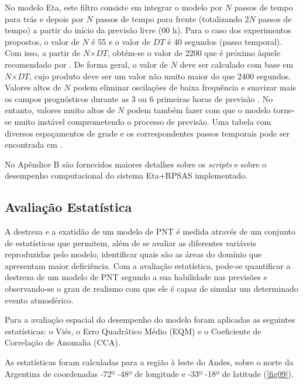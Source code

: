No modelo Eta, este filtro consiste em integrar o modelo por $N$ passos de tempo para trás e depois por $N$ passos de tempo para frente (totalizando $2N$ passos de tempo) a partir do início da previsão livre (00 h). Para o caso dos experimentos propostos, o valor de $N$ é 55 e o valor de $DT$ é 40 segundos (passo temporal). Com isso, a partir de $N$$\times$$DT$, obtém-se o valor de 2200 que é próximo àquele recomendado por . De forma geral, o valor de $N$ deve ser calculado com base em $N$$\times$$DT$, cujo produto deve ser um valor não muito maior do que 2400 segundos. Valores altos de $N$ podem eliminar oscilações de baixa frequência e suavizar mais os campos prognósticos durante as 3 ou 6 primeiras horas de previsão \cite{pyle02}. No entanto, valores muito altos de $N$ podem também fazer com que o modelo torne-se muito instável comprometendo o processo de previsão. Uma tabela com diversos espaçamentos de grade e os correspondentes passos temporais pode ser encontrada em .

No Apêndice B são fornecidos maiores detalhes sobre os \textit{scripts} e sobre o desempenho computacional do sistema Eta+RPSAS implementado.

\subsection{Avaliação Estatística}
    
A destreza e a exatidão de um modelo de PNT é medida através de um conjunto de estatísticas que permitem, além de se avaliar as diferentes variáveis reproduzidas pelo modelo, identificar quais são as áreas do domínio que apresentam maior deficiência. Com a avaliação estatística, pode-se quantificar a destreza de um modelo de PNT segundo a sua habilidade nas previsões e observando-se o grau de realismo com que ele é capaz de simular um determinado evento atmosférico.
    
Para a avaliação espacial do desempenho do modelo foram aplicadas as seguintes estatísticas: o Viés, o Erro Quadrático Médio (EQM) e o Coeficiente de Correlação de Anomalia (CCA).

As estatísticas foram calculadas para a região à leste do Andes, sobre o norte da Argentina de coordenadas -72º -48º de longitude e -33º -18º de latitude (\autoref{fig09}).


